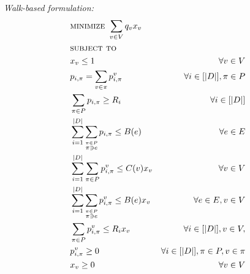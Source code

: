 \noindent{}
\begin{minipage}[t]{0.25\textwidth}
\textit{Walk-based formulation:}
\small
  \begin{subequations}
\begin{align*}
&\textsc{minimize } \sum_{v \in V} q_v x_v\\
&\textsc{subject to} \\
&x_v \leq 1 &\forall v \in V\\
& p_{i,\pi} = \sum \limits_{v\in \pi} p_{i,\pi}^v& \forall i \in [|D|], \pi \in P \\
& \sum_{\pi \in P}p_{i,\pi} \geq R_i &\forall i\in[|D|]\\
& \sum\limits_{i=1}^{|D|}\sum \limits_{\stackrel{\pi\in P}{\pi \ni e}} p_{i,\pi} \leq B(e) & \forall e \in E\\
&\sum\limits_{i=1}^{|D|} \sum \limits_{\pi\in P} p_{i, \pi}^v \leq C(v) x_v &\forall v \in V \\
& \sum\limits_{i=1}^{|D|}\sum\limits_{\stackrel{\pi\in P}{\pi \ni e}} p_{i,\pi}^v \leq B(e) x_v &\forall e \in E, v \in V\\
& \sum\limits_{\pi\in P} p_{i,\pi}^v \leq R_i x_v &\forall i\in[|D|], v \in V,\\
&p_{i,\pi}^v \geq 0 \hspace*{-.5in} &\forall i\in[|D|],\pi\in P, v \in \pi\\
&x_v \geq 0 &\forall v \in V
\end{align*}
\end{subequations}
\normalsize
 \end{minipage}
 \hfill
 \hspace{.2in}
